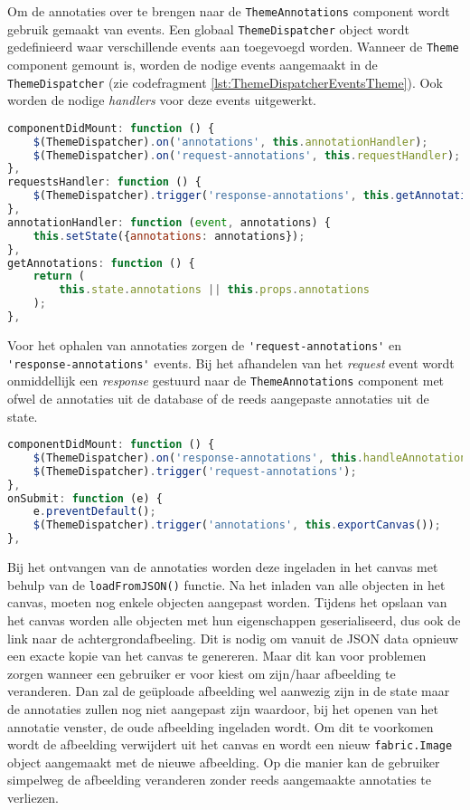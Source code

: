 Om de annotaties over te brengen naar de \lstinline{ThemeAnnotations} component wordt gebruik gemaakt van events. Een globaal \lstinline{ThemeDispatcher} object wordt gedefinieerd waar verschillende events aan toegevoegd worden. Wanneer de \lstinline{Theme} component gemount is, worden de nodige events aangemaakt in de \lstinline{ThemeDispatcher} (zie codefragment \ref{lst:ThemeDispatcherEventsTheme}). Ook worden de nodige \textit{handlers} voor deze events uitgewerkt.

\begin{lstlisting}[caption={Theme component - events},label=lst:ThemeDispatcherEventsTheme,language=javascript]
componentDidMount: function () {
	$(ThemeDispatcher).on('annotations', this.annotationHandler);
	$(ThemeDispatcher).on('request-annotations', this.requestHandler);
},
requestsHandler: function () {
	$(ThemeDispatcher).trigger('response-annotations', this.getAnnotations());
},
annotationHandler: function (event, annotations) {
	this.setState({annotations: annotations});
},
getAnnotations: function () {
	return (
		this.state.annotations || this.props.annotations
	);
},
\end{lstlisting}

Voor het ophalen van annotaties zorgen de \lstinline{'request-annotations'} en \lstinline{'response-annotations'} events. Bij het afhandelen van het \textit{request} event wordt onmiddellijk een \textit{response} gestuurd naar de \lstinline{ThemeAnnotations} component met ofwel de annotaties uit de database of de reeds aangepaste annotaties uit de state. 

\begin{lstlisting}[caption={ThemeAnnotations component - events},label=lst:ThemeDispatcherEventsThemeAnnotations,language=javascript]
componentDidMount: function () {
  	$(ThemeDispatcher).on('response-annotations', this.handleAnnotations);
	$(ThemeDispatcher).trigger('request-annotations');
},
onSubmit: function (e) {
	e.preventDefault();
	$(ThemeDispatcher).trigger('annotations', this.exportCanvas());
},
\end{lstlisting}

Bij het ontvangen van de annotaties worden deze ingeladen in het canvas met behulp van de \lstinline{loadFromJSON()} functie. Na het inladen van alle objecten in het canvas, moeten nog enkele objecten aangepast worden. Tijdens het opslaan van het canvas worden alle objecten met hun eigenschappen geserialiseerd, dus ook de link naar de achtergrondafbeeling. Dit is nodig om vanuit de JSON data opnieuw een exacte kopie van het canvas te genereren. Maar dit kan voor problemen zorgen wanneer een gebruiker er voor kiest om zijn/haar afbeelding te veranderen. Dan zal de ge\"{u}ploade afbeelding wel aanwezig zijn in de state maar de annotaties zullen nog niet aangepast zijn waardoor, bij het openen van het annotatie venster, de oude afbeelding ingeladen wordt. Om dit te voorkomen wordt de afbeelding verwijdert uit het canvas en wordt een nieuw \lstinline{fabric.Image} object aangemaakt met de nieuwe afbeelding. Op die manier kan de gebruiker simpelweg de afbeelding veranderen zonder reeds aangemaakte annotaties te verliezen. 

